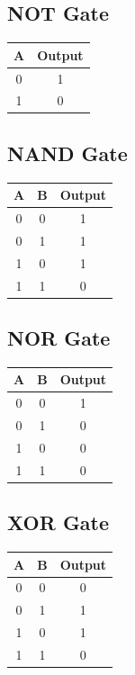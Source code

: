 \documentclass[12pt]{article}
\begin{document}
\subsection*{NOT Gate}
\begin{center}
\begin{tabular}{|c|c|}
\hline
A & Output \\
\hline
0 & 1 \\
1 & 0 \\
\hline
\end{tabular}
\end{center}

\subsection*{NAND Gate}
\begin{center}
\begin{tabular}{|c|c|c|}
\hline
A & B & Output \\
\hline
0 & 0 & 1 \\
0 & 1 & 1 \\
1 & 0 & 1 \\
1 & 1 & 0 \\
\hline
\end{tabular}
\end{center}

\subsection*{NOR Gate}
\begin{center}
\begin{tabular}{|c|c|c|}
\hline
A & B & Output \\
\hline
0 & 0 & 1 \\
0 & 1 & 0 \\
1 & 0 & 0 \\
1 & 1 & 0 \\
\hline
\end{tabular}
\end{center}

\subsection*{XOR Gate}
\begin{center}
\begin{tabular}{|c|c|c|}
\hline
A & B & Output \\
\hline
0 & 0 & 0 \\
0 & 1 & 1 \\
1 & 0 & 1 \\
1 & 1 & 0 \\
\hline
\end{tabular}
\end{center}
\end{document}

